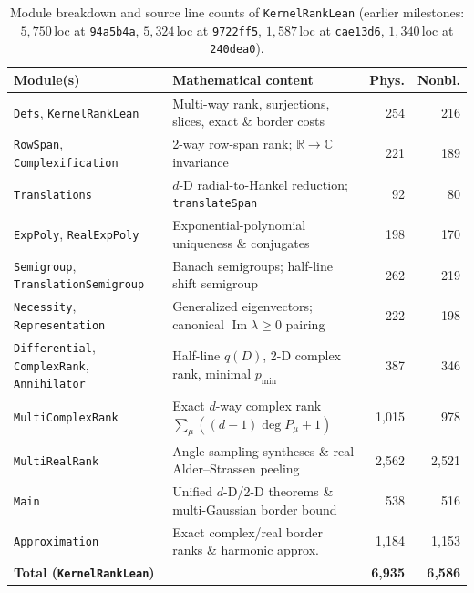 \documentclass[11pt,a4paper]{article}
\theoremstyle{plain}
\theoremstyle{definition}
\newcommand{\R}{\mathbb{R}}
\newcommand{\C}{\mathbb{C}}
\DeclareMathOperator{\ImPart}{Im}
\begin{document}
\begin{table}[h]
\centering
\caption{Module breakdown and source line counts of \texttt{KernelRankLean} (earlier milestones: $5{,}750$\,loc at \texttt{94a5b4a}, $5{,}324$\,loc at \texttt{9722ff5}, $1{,}587$\,loc at \texttt{cae13d6}, $1{,}340$\,loc at \texttt{240dea0}).}\label{tab:modules}
\smallskip
{\scriptsize\setlength{\tabcolsep}{3.0pt}
\begin{tabular}{@{}llrr@{}}
\toprule
Module(s) & Mathematical content & Phys. & Nonbl. \\
\midrule
\texttt{Defs}, \texttt{KernelRankLean} & Multi-way rank, surjections, slices, exact \& border costs & 254 & 216 \\
\texttt{RowSpan}, \texttt{Complexification} & 2-way row-span rank; $\R \to \C$ invariance & 221 & 189 \\
\texttt{Translations} & $d$-D radial-to-Hankel reduction; \texttt{translateSpan} & 92 & 80 \\
\texttt{ExpPoly}, \texttt{RealExpPoly} & Exponential-polynomial uniqueness \& conjugates & 198 & 170 \\
\texttt{Semigroup}, \texttt{TranslationSemigroup} & Banach semigroups; half-line shift semigroup & 262 & 219 \\
\texttt{Necessity}, \texttt{Representation} & Generalized eigenvectors; canonical $\ImPart\lambda \ge 0$ pairing & 222 & 198 \\
\texttt{Differential}, \texttt{ComplexRank}, \texttt{Annihilator} & Half-line $q(D)$, 2-D complex rank, minimal $p_{\min}$ & 387 & 346 \\
\texttt{MultiComplexRank} & Exact $d$-way complex rank $\sum_\mu ((d-1)\deg P_\mu + 1)$ & 1,015 & 978 \\
\texttt{MultiRealRank} & Angle-sampling syntheses \& real Alder--Strassen peeling & 2,562 & 2,521 \\
\texttt{Main} & Unified $d$-D/2-D theorems \& multi-Gaussian border bound & 538 & 516 \\
\texttt{Approximation} & Exact complex/real border ranks \& harmonic approx. & 1,184 & 1,153 \\
\midrule
\textbf{Total (\texttt{KernelRankLean})} & & \textbf{6,935} & \textbf{6,586} \\
\bottomrule
\end{tabular}}
\end{table}
\end{document}
